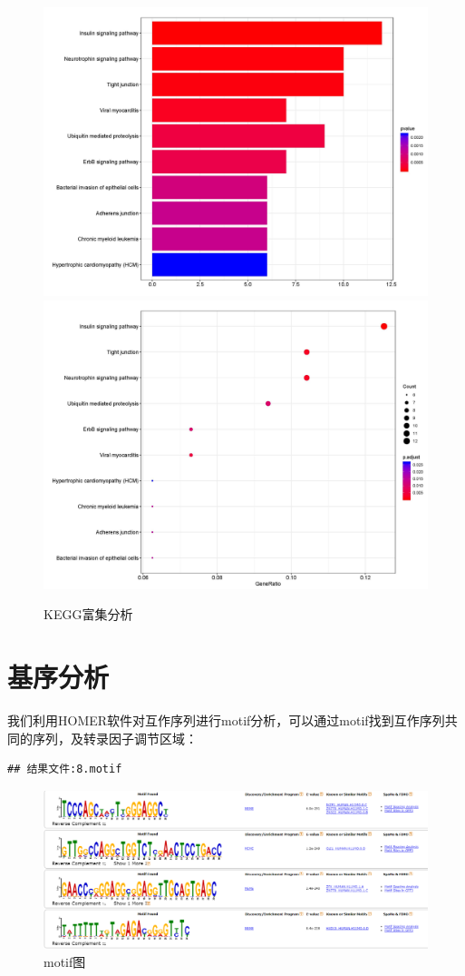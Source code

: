 \documentclass[
]{ctexart}
\begin{document}
\begin{figure}[H]

{\centering \includegraphics[width=0.48\linewidth]{./1.picture/ctrl_hubRNA_geneKEGGbar} \includegraphics[width=0.48\linewidth]{./1.picture/ctrl_hubRNA_geneKEGGdot} 

}

\caption{KEGG富集分析}\label{fig:unnamed-chunk-17}
\end{figure}

\hypertarget{ux57faux5e8fux5206ux6790}{%
\section{基序分析}\label{ux57faux5e8fux5206ux6790}}

我们利用HOMER软件对互作序列进行motif分析，可以通过motif找到互作序列共同的序列，及转录因子调节区域：

\begin{verbatim}
## 结果文件:8.motif
\end{verbatim}

\begin{figure}[H]

{\centering \includegraphics[width=1\linewidth]{./1.picture/motif} 

}

\caption{motif图}\label{fig:motif1}
\end{figure}
\end{document}
